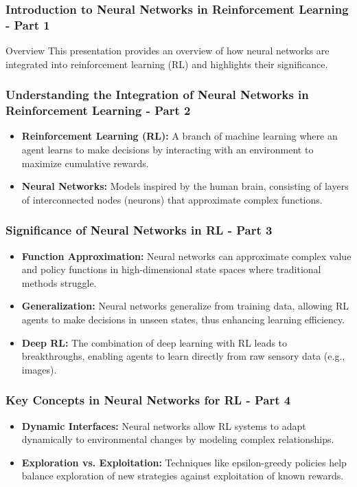\documentclass[aspectratio=169]{beamer}
\begin{document}
\frame{\titlepage}

\begin{frame}[fragile]
  \frametitle{Introduction to Neural Networks in Reinforcement Learning - Part 1}
  \begin{block}{Overview}
    This presentation provides an overview of how neural networks are integrated into reinforcement learning (RL) and highlights their significance.
  \end{block}
\end{frame}

\begin{frame}[fragile]
  \frametitle{Understanding the Integration of Neural Networks in Reinforcement Learning - Part 2}
  \begin{itemize}
    \item \textbf{Reinforcement Learning (RL):} A branch of machine learning where an agent learns to make decisions by interacting with an environment to maximize cumulative rewards.
    \item \textbf{Neural Networks:} Models inspired by the human brain, consisting of layers of interconnected nodes (neurons) that approximate complex functions.
  \end{itemize}
\end{frame}

\begin{frame}[fragile]
  \frametitle{Significance of Neural Networks in RL - Part 3}
  \begin{itemize}
    \item \textbf{Function Approximation:} Neural networks can approximate complex value and policy functions in high-dimensional state spaces where traditional methods struggle.
    \item \textbf{Generalization:} Neural networks generalize from training data, allowing RL agents to make decisions in unseen states, thus enhancing learning efficiency.
    \item \textbf{Deep RL:} The combination of deep learning with RL leads to breakthroughs, enabling agents to learn directly from raw sensory data (e.g., images).
  \end{itemize}
\end{frame}

\begin{frame}[fragile]
  \frametitle{Key Concepts in Neural Networks for RL - Part 4}
  \begin{itemize}
    \item \textbf{Dynamic Interfaces:} Neural networks allow RL systems to adapt dynamically to environmental changes by modeling complex relationships.
    \item \textbf{Exploration vs. Exploitation:} Techniques like epsilon-greedy policies help balance exploration of new strategies against exploitation of known rewards.
  \end{itemize}
\end{frame}
\end{document}
